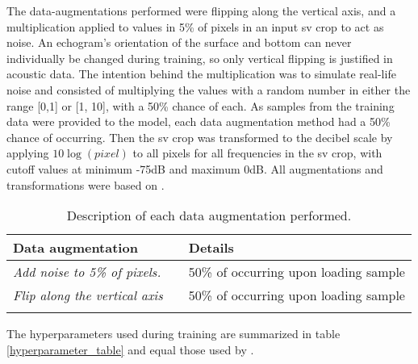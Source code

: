         The data-augmentations performed were flipping along the vertical axis, and a multiplication applied to values in 5\% of pixels in an input \gls{sv} crop to act as noise. An echogram’s orientation of the surface and bottom can never individually be changed during training, so only vertical flipping is justified in acoustic data. The intention behind the multiplication was to simulate real-life noise and consisted of multiplying the values with a random number in either the range [0,1] or [1, 10], with a 50\% chance of each.  As samples from the training data were provided to the model, each data augmentation method had a 50\% chance of occurring. Then the \gls{sv} crop was transformed to the decibel scale by applying $10\log{(pixel)}$ to all pixels for all frequencies in the \gls{sv} crop, with cutoff values at minimum -75dB and maximum 0dB. All augmentations and transformations were based on \citeauthor{brautaset2020acoustic} \cite{brautaset2020acoustic}. 
        
        
        
        \begin{longtable}{lll}

            \caption[Data augmentation summary]{Description of each data augmentation performed.}
            \\\hline
            \multicolumn{2}{|l|}{\textbf{Data augmentation}} & \multicolumn{1}{l|}{\textbf{Details}} \\ \hline
            \endfirsthead
            \endhead
            \textit{Add noise to 5\% of pixels.}      &       & 50\% of occurring upon loading sample \\ \hline
            \textit{Flip along the vertical axis}        &       & 50\% of occurring upon loading sample \\ \hline

            \label{data_augmentation_table}
        \end{longtable}
        
        The hyperparameters used during training are summarized in table \ref{hyperparameter_table} and equal those used by \citeauthor{brautaset2020acoustic}\cite{brautaset2020acoustic}.

